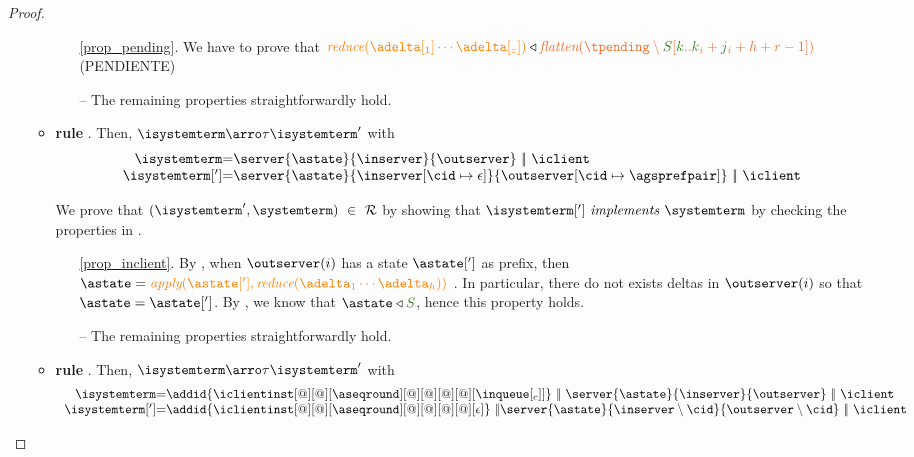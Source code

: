 \begin{proof}
\begin{itemize}
\begin{itemize}
\begin{enumerate}
						\item[\ref{prop_pending}.] We have to prove that $\ireduce{\adelta[_1]\cdots\adelta[_z]} \triangleleft \flatten{\tpending \setminus \queuemessage[\tknown .. \tknown_i + \treceivebuffer_i + h + r -1]}$ (PENDIENTE)
											
						\item[{--}] The remaining properties straightforwardly hold.

					\end{enumerate}
	
	
			\item {\bf rule }. Then, $\isystemterm  \arroi{\tau} \isystemterm '$ with 
				\[\begin{array}{r@{=}l}
					\isystemterm & \server{\astate}{\inserver}{\outserver} \ \bigpar\  \iclient 	\\
					\isystemterm['] & \server{\astate}{\inserver\upd\cid\epsilon}{\update{\outserver}{\cid}{\agsprefpair}}\ \bigpar\  \iclient 
				\end{array}
				\]

				We  prove that $(\isystemterm',\systemterm) \ \in \ \mathcal{R}$ by showing that $\implements{\isystemterm[']}{\systemterm}$ 
				by checking the properties in .	
				\begin{enumerate}
				
					\item[\ref{prop_inclient}.] By , when $\outserver(i)$ has a state $\astate[']$ as prefix, then $\astate = \iapply{\astate[']}{\ireduce{\adelta_1\cdots\adelta_h}}$ . In particular, there do not exists deltas in $\outserver(i)$ so that $\astate = \astate[']$. By , we know that $\astate \triangleleft \queuemessage$, hence this property holds.
											
						\item[{--}] The remaining properties straightforwardly hold.

					\end{enumerate}

			\item {\bf rule }. Then, $\isystemterm  \arroi{\tau} \isystemterm '$ with 
				\[\begin{array}{r@{=}l}
					\isystemterm & \addid{\iclientinst[@][@][\aseqround][@][@][@][@][\inclient]}
								   \ \bigpar \ \server{\astate}{\inserver}{\outserver} \ \bigpar \ \iclient 	\\
					\isystemterm['] & \addid{\iclientinst[@][@][\aseqround][@][@][@][@][\epsilon]}
									\ \bigpar \server{\astate}{\inserver \setminus\cid}{\outserver \setminus\cid}\ \bigpar \ \iclient 				
					\end{array}
				\]




\end{itemize}
\end{itemize}
\end{proof}

